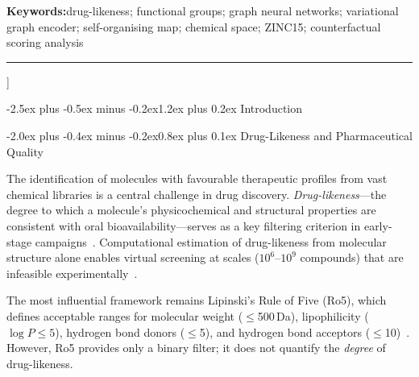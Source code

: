 \documentclass[10pt,a4paper,twocolumn]{article}
\makeatletter
\newcommand{\rof}{Ro5}
\newcommand{\logp}{\ensuremath{\log P}}
\renewcommand\section{\@startsection{section}{1}{\z@}%
  {-2.5ex plus -0.5ex minus -0.2ex}{1.2ex plus 0.2ex}%
  {\normalfont\Large\bfseries}}
\renewcommand\subsection{\@startsection{subsection}{2}{\z@}%
  {-2.0ex plus -0.4ex minus -0.2ex}{0.8ex plus 0.1ex}%
  {\normalfont\large\bfseries}}
\makeatother
\begin{document}
\begin{@twocolumnfalse}
\begin{center}
\begin{minipage}{0.95\textwidth}
\vspace{6pt}
\textbf{Keywords:}\enspace drug-likeness; functional groups; graph neural networks; variational graph encoder; self-organising map; chemical space; ZINC15; counterfactual scoring analysis
\end{minipage}

\vspace{4pt}
\noindent\rule{0.95\textwidth}{0.4pt}
\end{center}

\vspace{8pt}
\end{@twocolumnfalse}
]
\makeatother

\renewcommand{\thefootnote}{\fnsymbol{footnote}}
\renewcommand{\thefootnote}{\arabic{footnote}}
\setcounter{footnote}{0}

\linenumbers  %

\section{Introduction}
\label{sec:introduction}

\subsection{Drug-Likeness and Pharmaceutical Quality}

The identification of molecules with favourable therapeutic profiles from vast chemical libraries is a central challenge in drug discovery. \emph{Drug-likeness}---the degree to which a molecule's physicochemical and structural properties are consistent with oral bioavailability---serves as a key filtering criterion in early-stage campaigns~\cite{lipinski1997,leeson2007}. Computational estimation of drug-likeness from molecular structure alone enables virtual screening at scales ($10^6$--$10^9$ compounds) that are infeasible experimentally~\cite{ursu2011,cai2022}.

The most influential framework remains Lipinski's Rule of Five (\rof{}), which defines acceptable ranges for molecular weight ($\leq$500\,Da), lipophilicity ($\logp{} \leq 5$), hydrogen bond donors ($\leq$5), and hydrogen bond acceptors ($\leq$10)~\cite{lipinski1997}. However, \rof{} provides only a binary filter; it does not quantify the \emph{degree} of drug-likeness.
\end{document}

